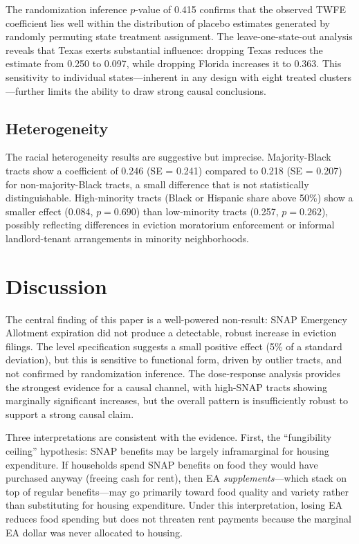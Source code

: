 \documentclass[12pt]{article}
\begin{document}
The randomization inference $p$-value of 0.415 confirms that the observed TWFE coefficient lies well within the distribution of placebo estimates generated by randomly permuting state treatment assignment. The leave-one-state-out analysis reveals that Texas exerts substantial influence: dropping Texas reduces the estimate from 0.250 to 0.097, while dropping Florida increases it to 0.363. This sensitivity to individual states---inherent in any design with eight treated clusters---further limits the ability to draw strong causal conclusions.

\subsection{Heterogeneity}

The racial heterogeneity results are suggestive but imprecise. Majority-Black tracts show a coefficient of 0.246 (SE = 0.241) compared to 0.218 (SE = 0.207) for non-majority-Black tracts, a small difference that is not statistically distinguishable. High-minority tracts (Black or Hispanic share above 50\%) show a smaller effect (0.084, $p = 0.690$) than low-minority tracts (0.257, $p = 0.262$), possibly reflecting differences in eviction moratorium enforcement or informal landlord-tenant arrangements in minority neighborhoods.

\section{Discussion}

The central finding of this paper is a well-powered non-result: SNAP Emergency Allotment expiration did not produce a detectable, robust increase in eviction filings. The level specification suggests a small positive effect (5\% of a standard deviation), but this is sensitive to functional form, driven by outlier tracts, and not confirmed by randomization inference. The dose-response analysis provides the strongest evidence for a causal channel, with high-SNAP tracts showing marginally significant increases, but the overall pattern is insufficiently robust to support a strong causal claim.

Three interpretations are consistent with the evidence. First, the ``fungibility ceiling'' hypothesis: SNAP benefits may be largely inframarginal for housing expenditure. If households spend SNAP benefits on food they would have purchased anyway (freeing cash for rent), then EA \emph{supplements}---which stack on top of regular benefits---may go primarily toward food quality and variety rather than substituting for housing expenditure. Under this interpretation, losing EA reduces food spending but does not threaten rent payments because the marginal EA dollar was never allocated to housing.
\end{document}
